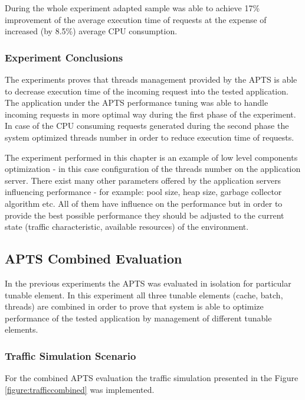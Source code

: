 \documentclass[12pt,a4paper]{article}
\begin{document}
During the whole experiment adapted sample was able to achieve 17\% improvement of the average execution time of requests at the expense of increased (by 8.5\%) average CPU consumption. 

\subsubsection{Experiment Conclusions} 

The experiments proves that threads management provided by the APTS is able to decrease execution time of the incoming request into the tested application. The application under the APTS performance tuning was able to handle incoming requests in more optimal way during the first phase of the experiment. In case of the CPU consuming requests generated during the second phase the system optimized threads number in order to reduce execution time of requests. 

The experiment performed in this chapter is an example of low level components optimization - in this case configuration of the threads number on the application server. There exist many other parameters offered by the application servers influencing performance - for example: pool size, heap size, garbage collector algorithm etc. All of them have influence on the performance but in order to provide the best possible performance they should be adjusted to the current state (traffic characteristic, available resources) of the environment. 


\subsection{APTS Combined Evaluation}

In the previous experiments the APTS was evaluated in isolation for particular tunable element. In this experiment all three tunable elements (cache, batch, threads) are combined in order to prove that system is able to optimize performance  of the tested application by management of different tunable elements.   

\subsubsection{Traffic Simulation Scenario} 

For the combined APTS evaluation the traffic simulation presented in the Figure \ref{figure:trafficcombined} was implemented. 
\end{document}
